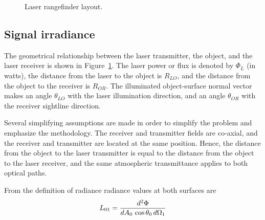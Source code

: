 \begin{figure}[t]
\centering
{}
\caption{Laser rangefinder layout.
\label{rangelay}}
\end{figure}


\subsection{Signal irradiance}
\noindent
The geometrical relationship between the laser transmitter, the object, and the laser receiver is shown in Figure~\ref{rangelay}. The laser power or flux is denoted by $\Phi_L$ (in watts), the distance from the laser to the object is $R_{LO}$, and the distance from the object to the receiver is $R_{OR}$. The illuminated object-surface normal vector makes an angle $\theta_{LO}$ with the laser illumination direction, and an angle $\theta_{OR}$ with the receiver sightline direction.

Several simplifying assumptions are made in order to simplify the problem and emphasize the methodology. The receiver and transmitter fields are co-axial, and the receiver and transmitter are located at the same position. Hence, the distance from the object to the laser transmitter is equal to the distance from the object to the laser receiver, and the same atmospheric transmittance applies to both optical paths.

From the definition of radiance \cite{Willers2013} radiance values at both surfaces are
\begin{equation}
L_{01}=\frac{d^2 \Phi}{d{}A_0\,\cos\theta_0\,d\Omega_1}\label{cc1}
\end{equation}


